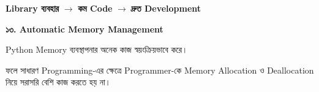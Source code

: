\begin{center}

\textbf{Library ব্যবহার}
\(\longrightarrow\)
\textbf{কম Code}
\(\longrightarrow\)
\textbf{দ্রুত Development}

\end{center}


\textbf{\color{darkTeal}১৩. Automatic Memory Management}

Python Memory ব্যবস্থাপনার অনেক কাজ স্বয়ংক্রিয়ভাবে করে।

ফলে সাধারণ Programming-এর ক্ষেত্রে Programmer-কে
Memory Allocation ও Deallocation নিয়ে সরাসরি বেশি কাজ
করতে হয় না।



